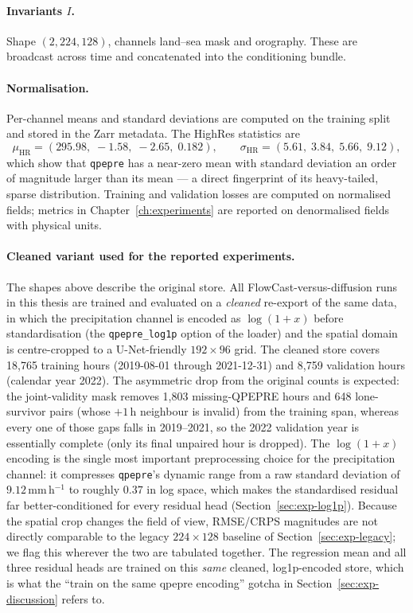 \paragraph{Invariants $I$.} Shape $(2, 224, 128)$, channels land--sea mask and orography. These are broadcast across time and concatenated into the conditioning bundle.

\paragraph{Normalisation.} Per-channel means and standard deviations are computed on the training split and stored in the Zarr metadata. The HighRes statistics are
\begin{equation}
  \mu_{\text{HR}} = (295.98,\; -1.58,\; -2.65,\; 0.182), \qquad
  \sigma_{\text{HR}} = (5.61,\; 3.84,\; 5.66,\; 9.12),
  \label{eq:hr-stats}
\end{equation}
which show that \texttt{qpepre} has a near-zero mean with standard deviation an order of magnitude larger than its mean --- a direct fingerprint of its heavy-tailed, sparse distribution. Training and validation losses are computed on normalised fields; metrics in Chapter~\ref{ch:experiments} are reported on denormalised fields with physical units.

\paragraph{Cleaned variant used for the reported experiments.} The shapes above describe the original store. All FlowCast-versus-diffusion runs in this thesis are trained and evaluated on a \emph{cleaned} re-export of the same data, in which the precipitation channel is encoded as $\log(1+x)$ before standardisation (the \texttt{qpepre\_log1p} option of the loader) and the spatial domain is centre-cropped to a U-Net-friendly $192 \times 96$ grid. The cleaned store covers 18{,}765 training hours (2019-08-01 through 2021-12-31) and 8{,}759 validation hours (calendar year 2022). The asymmetric drop from the original counts is expected: the joint-validity mask removes 1{,}803 missing-QPEPRE hours and 648 lone-survivor pairs (whose $+1$\,h neighbour is invalid) from the training span, whereas every one of those gaps falls in 2019--2021, so the 2022 validation year is essentially complete (only its final unpaired hour is dropped). The $\log(1+x)$ encoding is the single most important preprocessing choice for the precipitation channel: it compresses \texttt{qpepre}'s dynamic range from a raw standard deviation of $9.12$\,mm\,h$^{-1}$ to roughly $0.37$ in log space, which makes the standardised residual far better-conditioned for every residual head (Section~\ref{sec:exp-log1p}). Because the spatial crop changes the field of view, RMSE/CRPS magnitudes are not directly comparable to the legacy $224 \times 128$ baseline of Section~\ref{sec:exp-legacy}; we flag this wherever the two are tabulated together. The regression mean and all three residual heads are trained on this \emph{same} cleaned, log1p-encoded store, which is what the ``train on the same qpepre encoding'' gotcha in Section~\ref{sec:exp-discussion} refers to.

